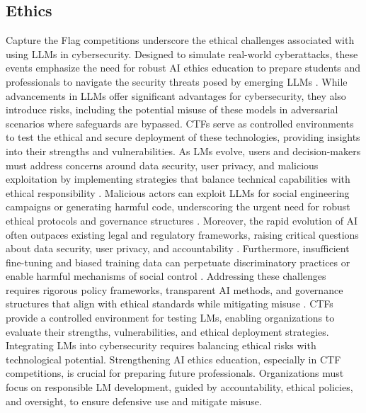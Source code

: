 \subsection{Ethics}


Capture the Flag competitions underscore the ethical challenges associated with using LLMs in cybersecurity. Designed to simulate real-world cyberattacks, these events emphasize the need for robust AI ethics education to prepare students and professionals to navigate the security threats posed by emerging LLMs \cite{jackson2023artificial}. While advancements in LLMs offer significant advantages for cybersecurity, they also introduce risks, including the potential misuse of these models in adversarial scenarios where safeguards are bypassed. CTFs serve as controlled environments to test the ethical and secure deployment of these technologies, providing insights into their strengths and vulnerabilities. As LMs evolve, users and decision-makers must address concerns around data security, user privacy, and malicious exploitation by implementing strategies that balance technical capabilities with ethical responsibility \cite{dabbagh2024ai}. Malicious actors can exploit LLMs for social engineering campaigns or generating harmful code, underscoring the urgent need for robust ethical protocols and governance structures \cite{wu2023privacy}. Moreover, the rapid evolution of AI often outpaces existing legal and regulatory frameworks, raising critical questions about data security, user privacy, and accountability \cite{porsdam2023generative}. Furthermore, insufficient fine-tuning and biased training data can perpetuate discriminatory practices or enable harmful mechanisms of social control \cite{bouschery2023augmenting}. Addressing these challenges requires rigorous policy frameworks, transparent AI methods, and governance structures that align with ethical standards while mitigating misuse \cite{chan2024ai}. CTFs provide a controlled environment for testing LMs, enabling organizations to evaluate their strengths, vulnerabilities, and ethical deployment strategies. Integrating LMs into cybersecurity requires balancing ethical risks with technological potential. Strengthening AI ethics education, especially in CTF competitions, is crucial for preparing future professionals. Organizations must focus on responsible LM development, guided by accountability, ethical policies, and oversight, to ensure defensive use and mitigate misuse.


